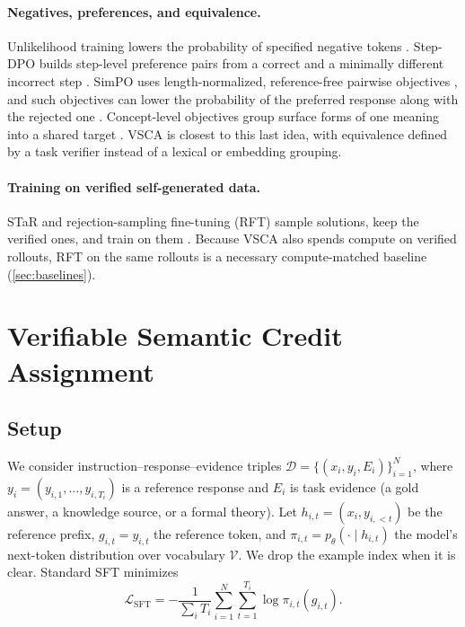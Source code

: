 \documentclass{article}
\newcommand{\vsca}{\textsc{VSCA}}
\newcommand{\loss}{\mathcal{L}}
\newcommand{\dataset}{\mathcal{D}}
\newcommand{\vocab}{\mathcal{V}}
\theoremstyle{plain}
\theoremstyle{remark}
\begin{document}
\paragraph{Negatives, preferences, and equivalence.} Unlikelihood training lowers the probability of specified negative tokens \citep{unlikelihood}. Step-DPO builds step-level preference pairs from a correct and a minimally different incorrect step \citep{stepDPO}. SimPO uses length-normalized, reference-free pairwise objectives \citep{simpo}, and such objectives can lower the probability of the preferred response along with the rejected one \citep{likelihoodDisplacement}. Concept-level objectives group surface forms of one meaning into a shared target \citep{beyondTokens}. \vsca{} is closest to this last idea, with equivalence defined by a task verifier instead of a lexical or embedding grouping.

\paragraph{Training on verified self-generated data.} STaR and rejection-sampling fine-tuning (RFT) sample solutions, keep the verified ones, and train on them \citep{star,rft}. Because \vsca{} also spends compute on verified rollouts, RFT on the same rollouts is a necessary compute-matched baseline (\cref{sec:baselines}).

\section{Verifiable Semantic Credit Assignment}
\label{sec:method}

\subsection{Setup}
We consider instruction--response--evidence triples $\dataset=\{(x_i,y_i,E_i)\}_{i=1}^{N}$, where $y_i=(y_{i,1},\ldots,y_{i,T_i})$ is a reference response and $E_i$ is task evidence (a gold answer, a knowledge source, or a formal theory). Let $h_{i,t}=(x_i,y_{i,<t})$ be the reference prefix, $g_{i,t}=y_{i,t}$ the reference token, and $\pi_{i,t}=p_\theta(\cdot\mid h_{i,t})$ the model's next-token distribution over vocabulary $\vocab$. We drop the example index when it is clear. Standard SFT minimizes
\begin{equation}
 \loss_{\mathrm{SFT}}=-\frac{1}{\sum_iT_i}\sum_{i=1}^{N}\sum_{t=1}^{T_i}\log \pi_{i,t}(g_{i,t}).
 \label{eq:sft}
\end{equation}
\end{document}
